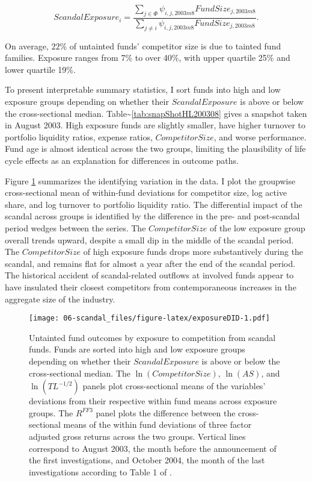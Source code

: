 \documentclass[openany]{book}
\theoremstyle{definition}
\theoremstyle{definition}
\theoremstyle{definition}
\theoremstyle{remark}
\begin{document}
\begin{equation}
ScandalExposure_i = \frac{\sum_{j\in \Phi} \psi_{i,j,2003m8} FundSize_{j,2003m8}}{\sum_{j\neq i}\psi_{i,j,2003m8} FundSize_{j,2003m8}}.
\end{equation}

On average, \(22\)\% of untainted funds' competitor size is due to
tainted fund families. Exposure ranges from 7\% to over 40\%, with upper
quartile 25\% and lower quartile 19\%.

To present interpretable summary statistics, I sort funds into high and
low exposure groups depending on whether their \(ScandalExposure\) is
above or below the cross-sectional median.
Table\textasciitilde{}\ref{tab:snapShotHL200308} gives a snapshot taken
in August 2003. High exposure funds are slightly smaller, have higher
turnover to portfolio liquidity ratios, expense ratios,
\(CompetitorSize\), and worse performance. Fund age is almost identical
across the two groups, limiting the plausibility of life cycle effects
as an explanation for differences in outcome paths.

Figure \ref{fig:exposureDID} summarizes the identifying variation in the
data. I plot the groupwise cross-sectional mean of within-fund
deviations for competitor size, log active share, and log turnover to
portfolio liquidity ratio. The differential impact of the scandal across
groups is identified by the difference in the pre- and post-scandal
period wedges between the series. The \(CompetitorSize\) of the low
exposure group overall trends upward, despite a small dip in the middle
of the scandal period. The \(CompetitorSize\) of high exposure funds
drops more substantively during the scandal, and remains flat for almost
a year after the end of the scandal period. The historical accident of
scandal-related outflows at involved funds appear to have insulated
their closest competitors from contemporaneous increases in the
aggregate size of the industry.

\begin{figure}
\centering
\texttt{[image: 06-scandal\_files/figure-latex/exposureDID-1.pdf]}
\caption{\label{fig:exposureDID}Untainted fund outcomes by exposure to
competition from scandal funds. Funds are sorted into high and low
exposure groups depending on whether their \(ScandalExposure\) is above
or below the cross-sectional median. The \(\ln(CompetitorSize)\),
\(\ln(AS)\), and \(\ln(TL^{-1/2})\) panels plot cross-sectional means of
the variables' deviations from their respective within fund means across
exposure groups. The \(R^{FF3}\) panel plots the difference between the
cross-sectional means of the within fund deviations of three factor
adjusted gross returns across the two groups. Vertical lines correspond
to August 2003, the month before the announcement of the first
investigations, and October 2004, the month of the last investigations
according to Table 1 of \citet{hw05}.}
\end{figure}
\end{document}
